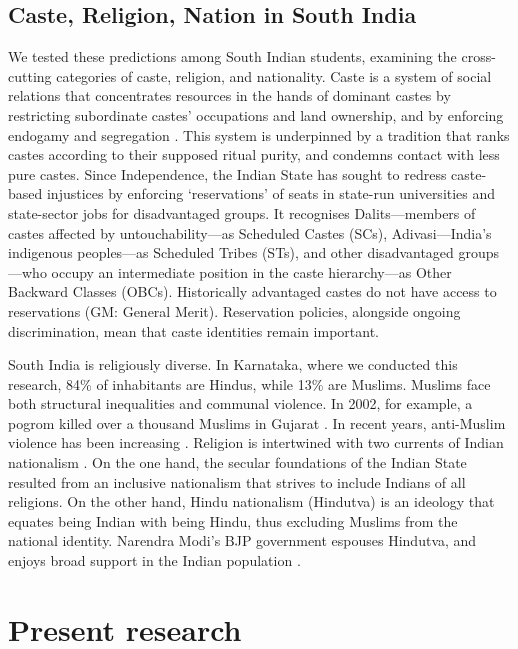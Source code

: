 \documentclass[12pt, a4paper]{article}
\begin{document}
\subsection{Caste, Religion, Nation in South India}

We tested these predictions among South Indian students, examining the cross-cutting categories of caste, religion, and nationality. Caste is a system of social relations that concentrates resources in the hands of dominant castes by restricting subordinate castes' occupations and land ownership, and by enforcing endogamy and segregation \cite{jodhka_caste_2012}. This system is underpinned by a tradition that ranks castes according to their supposed ritual purity, and condemns contact with less pure castes. Since Independence, the Indian State has sought to redress caste-based injustices by enforcing `reservations' of seats in state-run universities and state-sector jobs for disadvantaged groups. It recognises Dalits---members of castes affected by untouchability---as Scheduled Castes (SCs), Adivasi---India's indigenous peoples---as Scheduled Tribes (STs), and other disadvantaged groups---who occupy an intermediate position in the caste hierarchy---as Other Backward Classes (OBCs). Historically advantaged castes do not have access to reservations (GM: General Merit). Reservation policies, alongside ongoing discrimination, mean that caste identities remain important.

South India is religiously diverse. In Karnataka, where we conducted this research, 84\% of inhabitants are Hindus, while 13\% are Muslims. Muslims face both structural inequalities and communal violence. In 2002, for example, a pogrom killed over a thousand Muslims in Gujarat \cite{dhattiwala_political_2012}. In recent years, anti-Muslim violence has been increasing \cite{amnesty_india_2017}. Religion is intertwined with two currents of Indian nationalism \cite{menski_hindu_2009}. On the one hand, the secular foundations of the Indian State resulted from an inclusive nationalism that strives to include Indians of all religions. On the other hand, Hindu nationalism (Hindutva) is an ideology that equates being Indian with being Hindu, thus excluding Muslims from the national identity. Narendra Modi's BJP government espouses Hindutva, and enjoys broad support in the Indian population \cite{pew_three_2017}.

\section{Present research}
\end{document}
